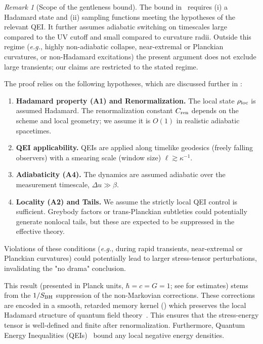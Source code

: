 \documentclass[11pt,a4paper]{article}
\newcommand{\eg}{\textit{e.g.}\xspace}
\theoremstyle{plain}
\theoremstyle{definition}
\theoremstyle{remark}
\newtheorem{remark}[theorem]{Remark}
\begin{document}
\begin{remark}[Scope of the gentleness bound]
The bound in~ requires (i) a Hadamard state and (ii) sampling functions meeting the hypotheses of the relevant QEI. It further assumes adiabatic switching on timescales large compared to the UV cutoff and small compared to curvature radii. Outside this regime (\eg, highly non-adiabatic collapse, near-extremal or Planckian curvatures, or non-Hadamard excitations) the present argument does not exclude large transients; our claims are restricted to the stated regime.

The proof relies on the following hypotheses, which are discussed further in :
\begin{enumerate}[label=(\roman*)]
    \item \textbf{Hadamard property (A1) and Renormalization.} The local state $\rho_{\rm loc}$ is assumed Hadamard. The renormalization constant $C_{\rm ren}$ depends on the scheme and local geometry; we assume it is $O(1)$ in realistic adiabatic spacetimes.
    \item \textbf{QEI applicability.} QEIs are applied along timelike geodesics (freely falling observers) with a smearing scale (window size) $\ell \gtrsim \kappa^{-1}$.
    \item \textbf{Adiabaticity (A4).} The dynamics are assumed adiabatic over the measurement timescale, $\Delta u \gg \beta$.
    \item \textbf{Locality (A2) and Tails.} We assume the strictly local QEI control is sufficient. Greybody factors or trans-Planckian subtleties could potentially generate nonlocal tails, but these are expected to be suppressed in the effective theory.
\end{enumerate}
Violations of these conditions (\eg, during rapid transients, near-extremal or Planckian curvatures) could potentially lead to larger stress-tensor perturbations, invalidating the "no drama" conclusion.
\end{remark}

This result (presented in Planck units, $\hbar=c=G=1$; see  for estimates) stems from the $1/S_{\rm BH}$ suppression of the non-Markovian corrections. These corrections are encoded in a smooth, retarded memory kernel () which preserves the local Hadamard structure of quantum field theory~\cite{Radzikowski:1996}. This ensures that the stress-energy tensor is well-defined and finite after renormalization. Furthermore, Quantum Energy Inequalities (QEIs)~\cite{Fewster:2012} bound any local negative energy densities.
\end{document}
